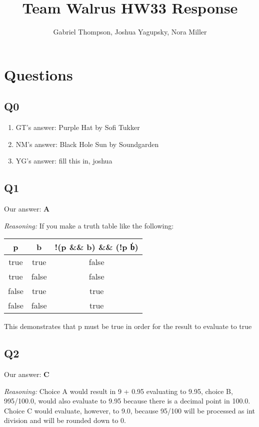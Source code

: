 \documentclass{article}
\title{Team Walrus HW33 Response}
\author{Gabriel Thompson, Joshua Yagupsky, Nora Miller}
\begin{document}
\maketitle

\section{Questions}

\subsection{Q0}

\begin{enumerate}
    \item[] GT's answer: Purple Hat by Sofi Tukker
    \item[] NM's answer: Black Hole Sun by Soundgarden
    \item[] YG's answer: {fill this in, joshua}
\end{enumerate}

\subsection{Q1}

Our answer: \textbf{A}

\noindent\textit{Reasoning:} If you make a truth table like the following:
\begin{center}
\begin{tabular}{||c c c||} 
 \hline
 p & b & !(p \&\& b) \&\& (!p \|\| b) \\ [0.5ex] 
 \hline\hline
 true & true & false \\ 
 \hline
 true & false & false \\ 
 \hline
 false & true & true \\ 
 \hline
 false & false & true \\ 
 \hline
\end{tabular}
\end{center}
This demonstrates that p must be true in order for the result to evaluate to true

\subsection{Q2}

Our answer: \textbf{C}

\noindent\textit{Reasoning:} Choice A would result in 9 + 0.95 evaluating to 9.95, choice B, 995/100.0, would also evaluate to 9.95 because there is a decimal point in 100.0. Choice C would evaluate, however, to 9.0, because 95/100 will be processed as int division and will be rounded down to 0.
\end{document}
